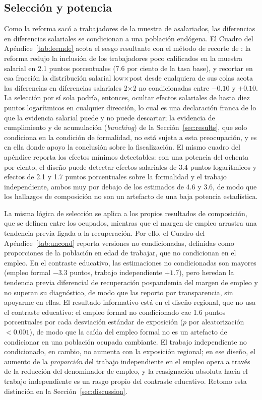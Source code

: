 \subsection{Selección y potencia}

Como la reforma sacó a trabajadores de la muestra de asalariados, las diferencias en diferencias salariales se condicionan a una población endógena. El Cuadro del Apéndice~\ref{tab:leemde} acota el sesgo resultante con el método de recorte de \citet{lee_2009}: la reforma redujo la inclusión de los trabajadores poco calificados en la muestra salarial en 2.1 puntos porcentuales (7.6 por ciento de la tasa base), y recortar en esa fracción la distribución salarial low$\times$post desde cualquiera de sus colas acota las diferencias en diferencias salariales 2$\times$2 no condicionadas entre $-0.10$ y $+0.10$. La selección por sí sola podría, entonces, ocultar efectos salariales de hasta diez puntos logarítmicos en cualquier dirección, lo cual es una declaración franca de lo que la evidencia salarial puede y no puede descartar; la evidencia de cumplimiento y de acumulación (\emph{bunching}) de la Sección~\ref{sec:results}, que solo condiciona en la condición de formalidad, no está sujeta a esta preocupación, y es en ella donde apoyo la conclusión sobre la fiscalización. El mismo cuadro del apéndice reporta los efectos mínimos detectables: con una potencia del ochenta por ciento, el diseño puede detectar efectos salariales de 3.4 puntos logarítmicos y efectos de 2.1 y 1.7 puntos porcentuales sobre la formalidad y el trabajo independiente, ambos muy por debajo de los estimados de 4.6 y 3.6, de modo que los hallazgos de composición no son un artefacto de una baja potencia estadística.

La misma lógica de selección se aplica a los propios resultados de composición, que se definen entre los ocupados, mientras que el margen de empleo arrastra una tendencia previa ligada a la recuperación. Por ello, el Cuadro del Apéndice~\ref{tab:uncond} reporta versiones no condicionadas, definidas como proporciones de la población en edad de trabajar, que no condicionan en el empleo. En el contraste educativo, las estimaciones no condicionadas son mayores (empleo formal $-3.3$ puntos, trabajo independiente $+1.7$), pero heredan la tendencia previa diferencial de recuperación pospandemia del margen de empleo y no superan su diagnóstico, de modo que las reporto por transparencia, sin apoyarme en ellas. El resultado informativo está en el diseño regional, que no usa el contraste educativo: el empleo formal no condicionado cae 1.6 puntos porcentuales por cada desviación estándar de exposición ($p$ por aleatorización $<0.001$), de modo que la caída del empleo formal no es un artefacto de condicionar en una población ocupada cambiante. El trabajo independiente no condicionado, en cambio, no aumenta con la exposición regional; en ese diseño, el aumento de la \emph{proporción} del trabajo independiente en el empleo opera a través de la reducción del denominador de empleo, y la reasignación absoluta hacia el trabajo independiente es un rasgo propio del contraste educativo. Retomo esta distinción en la Sección~\ref{sec:discussion}.

